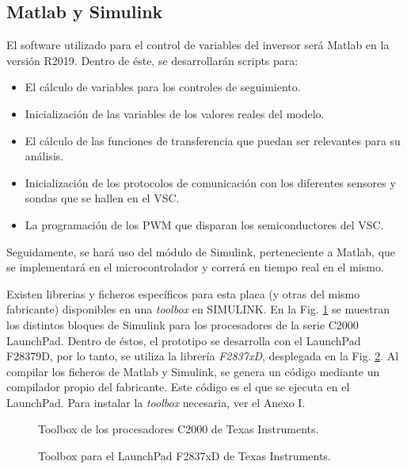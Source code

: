 \documentclass{report}
\begin{document}
\subsection{Matlab y Simulink} \label{sec.matlabsimulink}

El software utilizado para el control de variables del inversor será Matlab en la versión R2019. Dentro de éste, se desarrollarán scripts para:
\begin{itemize}
\item El cálculo de variables para los controles de seguimiento.
\item Inicialización de las variables de los valores reales del modelo.
\item El cálculo de las funciones de transferencia que puedan ser relevantes para su análisis.
\item Inicialización de los protocolos de comunicación con los diferentes sensores y sondas que se hallen en el VSC.
\item La programación de los PWM que disparan los semiconductores del VSC.
\end{itemize}

Seguidamente, se hará uso del módulo de Simulink, perteneciente a Matlab, que se implementará en el microcontrolador y correrá en tiempo real en el mismo.

Existen librerias y ficheros específicos para esta placa (y otras del mismo fabricante) disponibles en una \textit{toolbox} en SIMULINK. En la Fig. \ref{fig.toolbox} se muestran los distintos bloques de Simulink para los procesadores de la serie C2000 LaunchPad. Dentro de éstos, el prototipo se desarrolla con el LaunchPad F28379D, por lo tanto, se utiliza la librería \textit{F2837xD}, desplegada en la Fig. \ref{fig.toolbox_2}. Al compilar los ficheros de Matlab y Simulink, se genera un código mediante un compilador propio del fabricante. Este código es el que se ejecuta en el LaunchPad. Para instalar la \textit{toolbox} necesaria, ver el Anexo I.
\begin{figure}[!h]
    \begin{center}
        \end{center}
        \caption{Toolbox de los procesadores C2000 de Texas Instruments.\cite{cincuentaycinco}}
        \label{fig.toolbox}
\end{figure}

\begin{figure}[!h]
    \begin{center}
        \end{center}
        \caption{Toolbox para el LaunchPad F2837xD de Texas Instruments.\cite{cincuentaycinco}}
        \label{fig.toolbox_2}
\end{figure}
\end{document}
